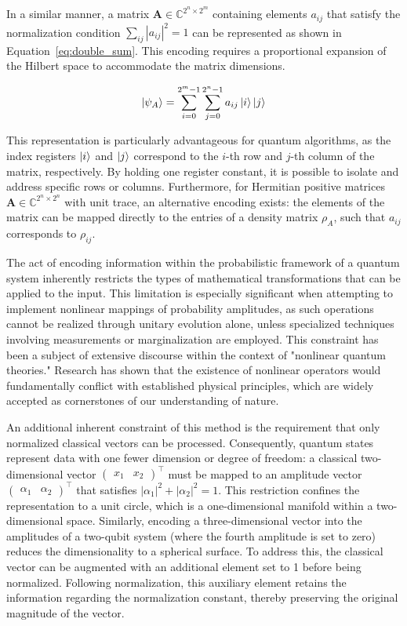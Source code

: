 \documentclass[en]{dimscthesis}
\begin{document}
In a similar manner, a matrix $\mathbf{A} \in \mathbb{C}^{2^n \times 2^m}$ containing elements $a_{ij}$ that satisfy the normalization condition $\sum_{ij} |a_{ij}|^2 = 1$ can be represented as shown in Equation~\ref{eq:double_sum}. This encoding requires a proportional expansion of the Hilbert space to accommodate the matrix dimensions.

\begin{equation}
	\ket{\psi_A} =\sum_{i=0}^{2^m-1} \sum_{j=0}^{2^n-1} a_{ij}\ket{i}\ket{j}
	\label{eq:double_sum}
\end{equation}

This representation is particularly advantageous for quantum algorithms, as the index registers $\ket{i}$ and $\ket{j}$ correspond to the $i$-th row and $j$-th column of the matrix, respectively. By holding one register constant, it is possible to isolate and address specific rows or columns. Furthermore, for Hermitian positive matrices $\mathbf{A} \in \mathbb{C}^{2^n \times 2^n}$ with unit trace, an alternative encoding exists: the elements of the matrix can be mapped directly to the entries of a density matrix $\rho_A$, such that $a_{ij}$ corresponds to $\rho_{ij}$.

The act of encoding information within the probabilistic framework of a quantum system inherently restricts the types of mathematical transformations that can be applied to the input. This limitation is especially significant when attempting to implement nonlinear mappings of probability amplitudes, as such operations cannot be realized through unitary evolution alone, unless specialized techniques involving measurements or marginalization are employed. This constraint has been a subject of extensive discourse within the context of "nonlinear quantum theories." Research has shown that the existence of nonlinear operators would fundamentally conflict with established physical principles, which are widely accepted as cornerstones of our understanding of nature.

An additional inherent constraint of this method is the requirement that only normalized classical vectors can be processed. Consequently, quantum states represent data with one fewer dimension or degree of freedom: a classical two-dimensional vector $\begin{pmatrix} x_1 & x_2 \end{pmatrix}^\top$ must be mapped to an amplitude vector $\begin{pmatrix} \alpha_1 & \alpha_2 \end{pmatrix}^\top$ that satisfies $|\alpha_1|^2 + |\alpha_2|^2 = 1$. This restriction confines the representation to a unit circle, which is a one-dimensional manifold within a two-dimensional space. Similarly, encoding a three-dimensional vector into the amplitudes of a two-qubit system (where the fourth amplitude is set to zero) reduces the dimensionality to a spherical surface. To address this, the classical vector can be augmented with an additional element set to 1 before being normalized. Following normalization, this auxiliary element retains the information regarding the normalization constant, thereby preserving the original magnitude of the vector.
\end{document}

